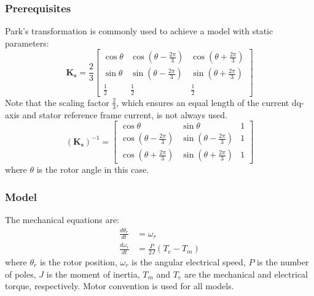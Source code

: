 \subsubsection{Prerequisites}
Park's transformation is commonly used to achieve a model with static parameters:
%
\begin{equation}
\mathbf{K_s} = \frac{2}{3}
 \begin{bmatrix} 
  \cos \theta & \cos(\theta-\frac{2\pi}{3}) & \cos(\theta+\frac{2\pi}{3}) \\
  \sin \theta & \sin(\theta-\frac{2\pi}{3}) & \sin(\theta+\frac{2\pi}{3}) \\
  \frac{1}{2} & \frac{1}{2} & \frac{1}{2}
 \end{bmatrix}
\end{equation}
%
Note that the scaling factor $\frac{2}{3}$, which ensures an equal length of the current dq-axis and stator reference frame current, is not always used. 
%
\begin{equation}
(\mathbf{K_s})^{-1} = 
 \begin{bmatrix} 
  \cos \theta & \sin \theta & 1 \\
  \cos(\theta-\frac{2\pi}{3}) & \sin(\theta-\frac{2\pi}{3}) & 1 \\
  \cos(\theta+\frac{2\pi}{3}) & \sin(\theta+\frac{2\pi}{3}) & 1
 \end{bmatrix}
\end{equation}
%
where $\theta$ is the rotor angle in this case.

\subsubsection{Model}

The mechanical equations are:
%
\begin{align}
\frac{d\theta_r}{dt} &= \omega_r \label{eq:d_theta} \\
\frac{d\omega_r}{dt} &= \frac{P}{2J} (T_e-T_m) \label{eq:d_omega}
\end{align}
%
where $\theta_r$ is the rotor position, $\omega_r$ is the angular electrical speed, $P$ is the number of poles, $J$ is the moment of inertia, $T_m$ and $T_e$ are the mechanical and electrical torque, respectively. Motor convention is used for all models. 

